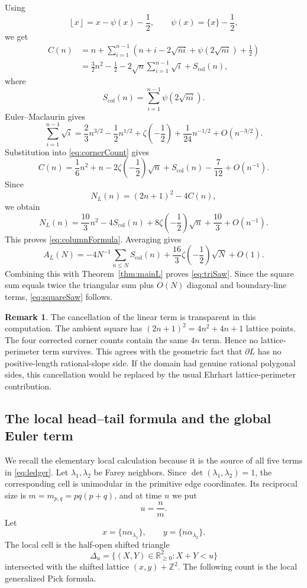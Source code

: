 \documentclass[a4paper,american,11pt]{amsart}
\theoremstyle{plain}
\theoremstyle{definition}
\newtheorem{remark}[theorem]{Remark}
\newcommand{\Z}{\mathbb Z}
\newcommand{\R}{\mathbb R}
\newcommand{\floor}[1]{\left\lfloor #1\right\rfloor}
\begin{document}
Using
\[
 \floor{x}=x-\psi(x)-\frac12,
 \qquad
 \psi(x)=\{x\}-\frac12,
\]
we get
\begin{align*}
 C(n)
 &=n+\sum_{i=1}^{n-1}\left(n+i-2\sqrt{ni}+\psi(2\sqrt{ni})+\frac12\right)\\
 &=\frac32n^2-\frac12
 -2\sqrt n\sum_{i=1}^{n-1}\sqrt i
 +S_{\mathrm{col}}(n),
\end{align*}
where
\[
 S_{\mathrm{col}}(n)=\sum_{i=1}^{n-1}\psi(2\sqrt{ni}).
\]
Euler--Maclaurin gives
\begin{equation}\label{eq:EMsqrt}
 \sum_{i=1}^{n-1}\sqrt i
 =\frac23 n^{3/2}-\frac12 n^{1/2}+\zeta\!\left(-\frac12\right)+\frac1{24}n^{-1/2}+O(n^{-3/2}).
\end{equation}
Substitution into \eqref{eq:cornerCount} gives
\[
 C(n)=\frac16n^2+n-2\zeta\!\left(-\frac12\right)\sqrt n+S_{\mathrm{col}}(n)-\frac7{12}+O(n^{-1}).
\]
Since
\[
 N_L(n)=(2n+1)^2-4C(n),
\]
we obtain
\[
 N_L(n)=\frac{10}{3}n^2-4S_{\mathrm{col}}(n)+8\zeta\!\left(-\frac12\right)\sqrt n+\frac{10}{3}+O(n^{-1}).
\]
This proves \eqref{eq:columnFormula}.  Averaging gives
\[
 A_L(N)=-4N^{-1}\sum_{n\le N}S_{\mathrm{col}}(n)+\frac{16}{3}\zeta\!\left(-\frac12\right)\sqrt N+O(1).
\]
Combining this with Theorem~\ref{thm:mainL} proves \eqref{eq:triSaw}.  Since
the square sum equals twice the triangular sum plus \(O(N)\) diagonal and
boundary-line terms, \eqref{eq:squareSaw} follows.

\begin{remark}
The cancellation of the linear term is transparent in this computation.  The
ambient square has \((2n+1)^2=4n^2+4n+1\) lattice points.  The four corrected
corner counts contain the same \(4n\) term.  Hence no lattice-perimeter term
survives.  This agrees with the geometric fact that \(\partial L\) has no
positive-length rational-slope side.  If the domain had genuine rational
polygonal sides, this cancellation would be replaced by the usual Ehrhart
lattice-perimeter contribution.
\end{remark}

\subsection{The local head--tail formula and the global Euler term}

We recall the elementary local calculation because it is the source of all
five terms in \eqref{eq:ledger}.  Let \(\lambda_1,\lambda_2\) be Farey
neighbors.  Since \(\det(\lambda_1,\lambda_2)=1\), the corresponding cell is
unimodular in the primitive edge coordinates.  Its reciprocal size is
\(m=m_{p,q}=pq(p+q)\), and at time \(n\) we put
\[
 u=\frac{n}{m}.
\]
Let
\[
 x=\{n\alpha_{\lambda_1}\},
 \qquad
 y=\{n\alpha_{\lambda_2}\}.
\]
The local cell is the half-open shifted triangle
\[
 \Delta_u=\{(X,Y)\in\R^2_{\ge0}:X+Y<u\}
\]
intersected with the shifted lattice \((x,y)+\Z^2\).  The following count is
the local generalized Pick formula.
\end{document}
